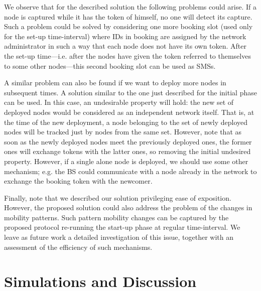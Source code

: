 \documentclass{IEEEconf}
\begin{document}
We observe that for the described solution the following problems could arise. If a node is captured while it has the token of himself, no one will detect its capture.
Such a problem could be solved by considering one more booking slot (used only for the set-up time-interval) where IDs in booking are assigned by the network administrator in such a way that each node does not have its own token. After the set-up time---i.e. after the nodes have given  the token referred to themselves to some other nodes---this second booking slot can be used as SMSs.

A similar problem can also be found if we want to deploy more nodes in subsequent times. A solution similar to the one just described for the initial phase can be used. In this case, an undesirable property will hold: the new set of deployed nodes would be considered as an independent network itself. That is, at the time of the new deployment, a node belonging to the set of newly deployed nodes will be tracked just by nodes from the same set. However, note that as soon as the newly deployed nodes meet the previously deployed ones, the former ones will exchange tokens with the latter ones, so removing the initial undesired property.
However, if a single alone node is deployed, we should use some other mechanism; e.g. the BS could communicate with a node already in the network to exchange the booking token with the newcomer.


Finally,
note that we described our solution privileging ease of exposition.
 However, the proposed solution could also address the problem of the changes in mobility patterns.
Such pattern mobility changes can be captured by the proposed protocol re-running the start-up phase at regular time-interval.
We leave as future work a detailed investigation of this issue, together with an assessment of the efficiency of such mechanisms.
























\section{Simulations and Discussion}
\label{Simulations}
\end{document}
